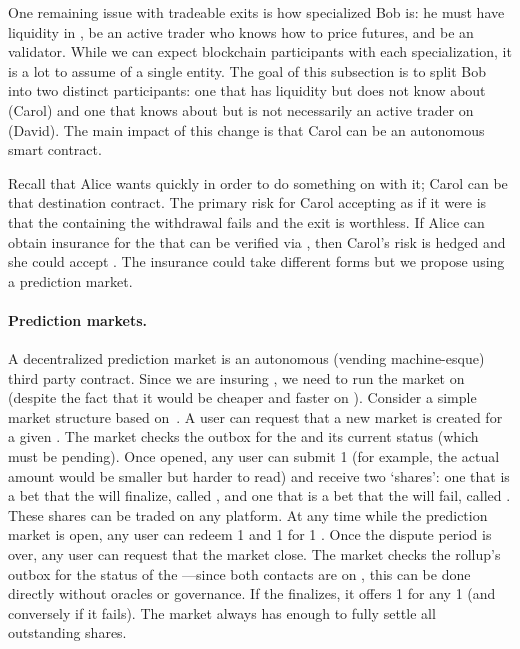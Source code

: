 One remaining issue with tradeable exits is how specialized Bob is: he must have liquidity in \ethone, be an active trader who knows how to price futures, and be an \layertwo validator. While we can expect blockchain participants with each specialization, it is a lot to assume of a single entity. The goal of this subsection is to split Bob into two distinct participants: one that has \ethone liquidity but does not know about \layertwo (Carol) and one that knows about \layertwo but is not necessarily an active trader on \layerone (David). The main impact of this change is that Carol can be an autonomous \layerone smart contract. 

Recall that Alice wants \ethone quickly in order to do something on \layerone with it; Carol can be that destination contract. The primary risk for Carol accepting \ethxx as if it were \ethone is that the \rblock containing the \ethxx withdrawal fails and the exit is worthless. If Alice can obtain insurance for the \ethxx that can be verified via \layerone, then Carol's risk is hedged and she could accept \ethxx. The insurance could take different forms but we propose using a prediction market.

\paragraph*{Prediction markets.} A decentralized prediction market is an autonomous (\eg vending machine-esque) third party contract. Since we are insuring \layerone \ethxx, we need to run the market on \layerone (despite the fact that it would be cheaper and faster on \layertwo). Consider a simple market structure based on~\cite{clark2014decentralizing}. A user can request that a new market is created for a given \rblock. The market checks the outbox for the \rblock and its current status (which must be pending). Once opened, any user can submit 1 \ethone (for example, the actual amount would be smaller but harder to read) and receive two `shares': one that is a bet that the \rblock will finalize, called \final, and one that is a bet that the \rblock will fail, called \fail. These shares can be traded on any platform. At any time while the prediction market is open, any user can redeem 1 \final and 1 \fail for 1 \ethone. Once the dispute period is over, any user can request that the market close. The market checks the rollup's outbox for the status of the \rblock---since both contacts are on \layerone, this can be done directly without oracles or governance. If the \rblock finalizes, it offers 1 \ethone for any 1 \final (and conversely if it fails). The market always has enough \ethone to fully settle all outstanding shares.

